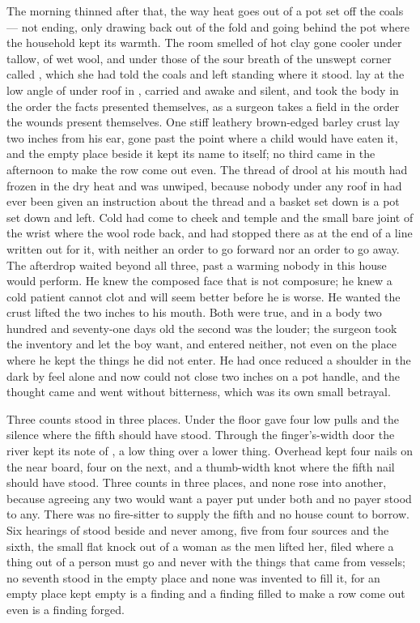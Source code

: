 The morning thinned after that, the way heat goes out of a pot set off the coals --- not ending, only drawing back out of the fold and going behind the pot where the household kept its warmth. The room smelled of hot clay gone cooler under tallow, of wet wool, and under those of the sour breath of the unswept corner called , which she had told the coals and left standing where it stood.  lay at the low angle of  under  roof in , carried and awake and silent, and took the body in the order the facts presented themselves, as a surgeon takes a field in the order the wounds present themselves. One stiff leathery brown-edged barley crust lay two inches from his ear, gone past the point where a child would have eaten it, and the empty place beside it kept its name to itself; no third came in the afternoon to make the row come out even. The thread of drool at his mouth had frozen in the dry heat and was unwiped, because nobody under any roof in  had ever been given an instruction about the thread and a basket set down is a pot set down and left. Cold had come to cheek and temple and the small bare joint of the wrist where the wool rode back, and had stopped there as at the end of a line written out for it, with neither an order to go forward nor an order to go away. The afterdrop waited beyond all three, past a warming nobody in this house would perform. He knew the composed face that is not composure; he knew a cold patient cannot clot and will seem better before he is worse. He wanted the crust lifted the two inches to his mouth. Both were true, and in a body two hundred and seventy-one days old the second was the louder; the surgeon took the inventory and let the boy want, and entered neither, not even on the place where he kept the things he did not enter. He had once reduced a shoulder in the dark by feel alone and now could not close two inches on a pot handle, and the thought came and went without bitterness, which was its own small betrayal.

Three counts stood in three places. Under the floor  gave four low pulls and the silence where the fifth should have stood. Through the finger's-width door the river kept its note of , a low thing over a lower thing. Overhead  kept four nails on the near board, four on the next, and a thumb-width knot where the fifth nail should have stood. Three counts in three places, and none rose into another, because agreeing any two would want a payer put under both and no payer stood to any. There was no fire-sitter to supply the fifth and no house count to borrow. Six hearings of  stood beside and never among, five from four sources and the sixth, the small flat knock out of a woman as the men lifted her, filed where a thing out of a person must go and never with the things that came from vessels; no seventh stood in the empty place and none was invented to fill it, for an empty place kept empty is a finding and a finding filled to make a row come out even is a finding forged.

